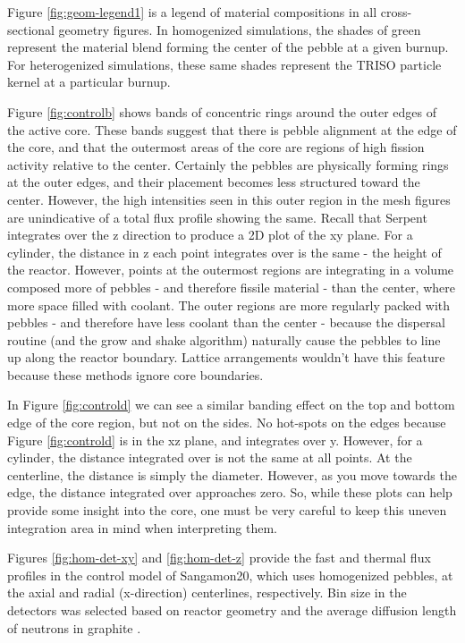 Figure \ref{fig:geom-legend1} is a legend of material compositions in all cross-sectional geometry figures.  In homogenized simulations, the shades of green represent the material blend forming the center of the pebble at a given burnup.  For heterogenized simulations, these same shades represent the TRISO particle kernel at a particular burnup.



Figure \ref{fig:controlb} shows bands of concentric rings around the outer edges of the active core.  These bands suggest that there is pebble alignment at the edge of the core, and that the outermost areas of the core are regions of high fission activity relative to the center.  Certainly the pebbles are physically forming rings at the outer edges, and their placement becomes less structured toward the center.  However, the high intensities seen in this outer region in the mesh figures are unindicative of a total flux profile showing the same.  Recall that Serpent integrates over the z direction to produce a 2D plot of the xy plane.  For a cylinder, the distance in z each point integrates over is the same - the height of the reactor.  However, points at the outermost regions are integrating in a volume composed more of pebbles - and therefore fissile material - than the center, where more space filled with coolant.  The outer regions are more regularly packed with pebbles - and therefore have less coolant than the center - because the dispersal routine (and the grow and shake algorithm) naturally cause the pebbles to line up along the reactor boundary.  Lattice arrangements wouldn't have this feature because these methods ignore core boundaries.

In Figure \ref{fig:controld} we can see a similar banding effect on the top and bottom edge of the core region, but not on the sides.  No hot-spots on the edges because Figure \ref{fig:controld} is in the xz plane, and integrates over y.  However, for a cylinder, the distance integrated over is not the same at all points.  At the centerline, the distance is simply the diameter.  However, as you move towards the edge, the distance integrated over approaches zero.  So, while these plots can help provide some insight into the core, one must be very careful to keep this uneven integration area in mind when interpreting them.

Figures \ref{fig:hom-det-xy} and \ref{fig:hom-det-z} provide the fast and thermal flux profiles in the control model of Sangamon20, which uses homogenized pebbles, at the axial and radial (x-direction) centerlines, respectively.  Bin size in the detectors was selected based on reactor geometry and the average diffusion length of neutrons in graphite \cite{hereward_measurement_1947}.

